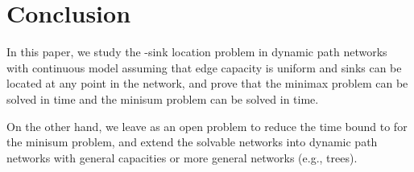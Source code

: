 \documentclass[a4paper]{llncs}
\begin{document}
\section{Conclusion}
In this paper, we study the -sink location problem in dynamic path networks with continuous model assuming that edge capacity is uniform and sinks can be located at any point in the network, and prove that the minimax problem can be solved in  time and the minisum problem can be solved in  time.

On the other hand, we leave as an open problem to reduce the time bound to  for the minisum problem,
and extend the solvable networks into dynamic path networks with general capacities or more general networks (e.g., trees).







\clearpage
\end{document}
